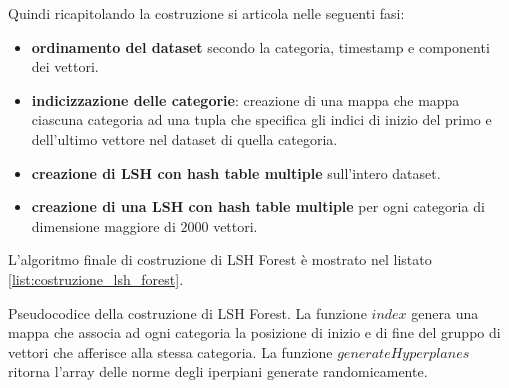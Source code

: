 Quindi ricapitolando la costruzione si articola nelle seguenti fasi:
\begin{itemize}
    \item \textbf{ordinamento del dataset} secondo la categoria, timestamp e componenti dei vettori.
    \item \textbf{indicizzazione delle categorie}: creazione di una mappa che 
    mappa ciascuna categoria ad una tupla che specifica gli indici di inizio 
    del primo e dell'ultimo vettore nel dataset di quella categoria.
    \item \textbf{creazione di LSH con hash table multiple} sull'intero dataset.
    \item \textbf{creazione di una LSH con hash table multiple} per ogni categoria 
    di dimensione maggiore di $2000$ vettori.
\end{itemize}

L'algoritmo finale di costruzione di LSH Forest è mostrato nel listato \ref{list:costruzione_lsh_forest}.

\begin{algorithm} [!h]
    \SetAlgoLined
    

    

    \caption{Pseudocodice della costruzione di LSH Forest. La funzione $index$ genera 
    una mappa che associa ad ogni categoria la posizione di inizio e di fine del 
    gruppo di vettori che afferisce alla stessa categoria. La funzione 
    $generateHyperplanes$ ritorna l'array delle norme degli iperpiani generate 
    randomicamente.}
    \label{list:costruzione_lsh_forest}
\end{algorithm}

